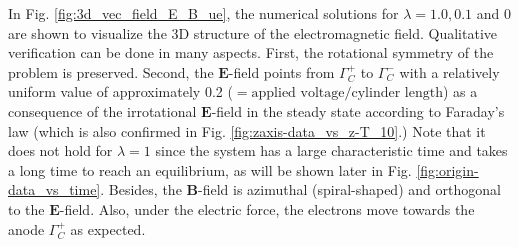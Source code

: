 \documentclass{article}
\begin{document}
In Fig. \ref{fig:3d_vec_field_E_B_ue}, the numerical solutions for $\lambda = 1.0, 0.1$ and $0$ are shown to visualize the 3D structure of the electromagnetic field. Qualitative verification can be done in many aspects. First, the rotational symmetry of the problem is preserved. Second, the $\mathbf{E}$-field points from $\Gamma^+_C$ to $\Gamma^-_C$ with a relatively uniform value of approximately 0.2 ($=\text{applied voltage}/\text{cylinder length}$) as a consequence of the irrotational $\mathbf{E}$-field in the steady state according to Faraday's law (which is also confirmed in Fig. \ref{fig:zaxis-data_vs_z-T_10}.) Note that it does not hold for $\lambda = 1$ since the system has a large characteristic time and takes a long time to reach an equilibrium, as will be shown later in Fig. \ref{fig:origin-data_vs_time}. Besides, the $\mathbf{B}$-field is azimuthal (spiral-shaped) and orthogonal to the $\mathbf{E}$-field. Also, under the electric force, the electrons move towards the anode $\Gamma^+_C$ as expected.
\end{document}
